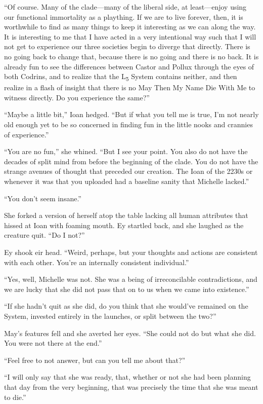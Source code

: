``Of course. Many of the clade---many of the liberal side, at least---enjoy using our functional immortality as a plaything. If we are to live forever, then, it is worthwhile to find as many things to keep it interesting as we can along the way. It is interesting to me that I have acted in a very intentional way such that I will not get to experience our three societies begin to diverge that directly. There is no going back to change that, because there is no going and there is no back. It is already fun to see the differences between Castor and Pollux through the eyes of both Codrins, and to realize that the L\textsubscript{5} System contains neither, and then realize in a flash of insight that there is no May Then My Name Die With Me to witness directly. Do you experience the same?''

``Maybe a little bit,'' Ioan hedged. ``But if what you tell me is true, I'm not nearly old enough yet to be so concerned in finding fun in the little nooks and crannies of experience.''

``You are no fun,'' she whined. ``But I see your point. You also do not have the decades of split mind from before the beginning of the clade. You do not have the strange avenues of thought that preceded our creation. The Ioan of the 2230s or whenever it was that you uploaded had a baseline sanity that Michelle lacked.''

``You don't seem insane.''

She forked a version of herself atop the table lacking all human attributes that hissed at Ioan with foaming mouth. Ey startled back, and she laughed as the creature quit. ``Do I not?''

Ey shook eir head. ``Weird, perhaps, but your thoughts and actions are consistent with each other. You're an internally consistent individual.''

``Yes, well, Michelle was not. She was a being of irreconcilable contradictions, and we are lucky that she did not pass that on to us when we came into existence.''

``If she hadn't quit as she did, do you think that she would've remained on the System, invested entirely in the launches, or split between the two?''

May's features fell and she averted her eyes. ``She could not do but what she did. You were not there at the end.''

``Feel free to not answer, but can you tell me about that?''

``I will only say that she was ready, that, whether or not she had been planning that day from the very beginning, that was precisely the time that she was meant to die.''

